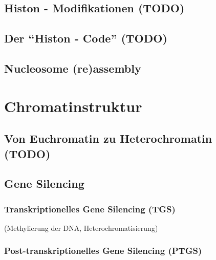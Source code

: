 \subsection{Histon - Modifikationen (TODO)}\label{subsec:histon---modifikationen}


\subsection{Der ``Histon - Code'' (TODO)}\label{subsec:der-``histon---code''}


\subsection{Nucleosome (re)assembly}\label{subsec:nucleosome-(re)assembly}





\section{Chromatinstruktur}\label{sec:chromatinstruktur}

\subsection*{Von Euchromatin zu Heterochromatin (TODO)}

\subsection{Gene Silencing}\label{subsec:gene-silencing}

\subsubsection{Transkriptionelles Gene Silencing (TGS)}
(Methylierung der DNA, Heterochromatisierung)

\subsubsection{Post-transkriptionelles Gene Silencing (PTGS)}


